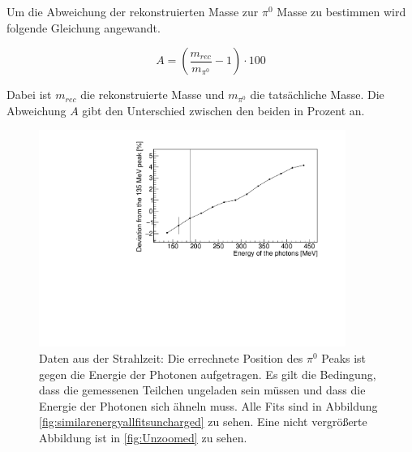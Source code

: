\documentclass[a4paper,11pt,oneside,final,german,openbib,pdftex]{scrbook}
\begin{document}
{ %
 
 
 Um die Abweichung der rekonstruierten Masse zur $\pi^0$ Masse zu bestimmen wird folgende Gleichung angewandt.
 
 \begin{equation}
 A = (\frac{m_{rec}}{m_{\pi^0}}-1) \cdot 100
 \end{equation}
 
 Dabei ist $m_{rec}$ die rekonstruierte Masse und $m_{\pi^0}$ die tats\"achliche Masse. Die Abweichung $A$ gibt den Unterschied zwischen den beiden in Prozent an.
 
 
 \begin{figure}[h!]
 	\begin{center}
 		\includegraphics[width=100mm]{201728104StrahlzeitNoCutZoomed}
 	
 		\caption[Strahlzeit: Abweichung; keine weiteren Bedingungen]{Daten aus der Strahlzeit: Die errechnete Position des $\pi^0$ Peaks ist gegen die Energie der Photonen aufgetragen.
 			Es gilt die Bedingung, dass die gemessenen Teilchen ungeladen sein m\"ussen und dass die Energie der Photonen sich \"ahneln muss. Alle Fits sind in Abbildung \ref{fig:similarenergyallfitsuncharged} zu sehen. Eine nicht vergrößerte Abbildung ist in \ref{fig:Unzoomed} zu sehen.} 
 		\label{fig.Energydependency_pion}
 	\end{center}
 \end{figure}

}
\end{document}
